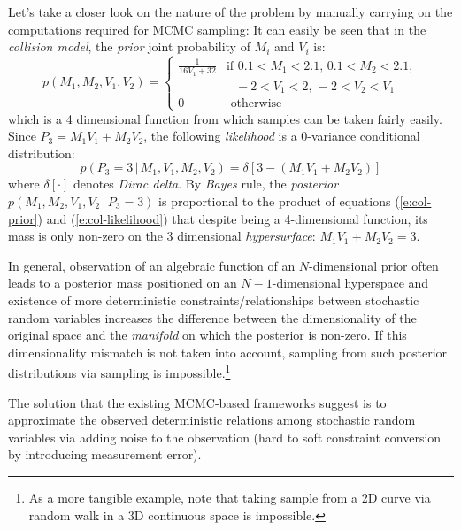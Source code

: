 \documentclass{article}
\newcommand{\otherwise}[1]{#1 &\text{ otherwise}}
\newcommand{\pr}{p}
\begin{document}
Let's take a closer look on the nature of the problem by manually carrying on the computations required for MCMC sampling:
It can easily be seen that in the \emph{collision model}, 
the \emph{prior} joint probability of 
{\footnotesize $M_i$} and 
{\footnotesize $V_i$} is:
{\footnotesize
\begin{equation}  
\label{e:col-prior}
\pr(M_1, M_2, V_1, V_2)  
=
\begin{cases}
\frac{1}{16 V_1 + 32} &{\text{if }\scriptstyle 0.1<M_1<2.1, \, 0.1<M_2<2.1,}\\
							 &{\;\;\, \scriptstyle -2<V_1<2, \, -2<V_2 < V_1}\\
 \otherwise{0}
 \end{cases}
\end{equation}
}
which is a 4 dimensional function from which samples can be taken fairly easily. 
Since {\footnotesize $P_3 = M_1 V_1 + M_2 V_2$}, 
the following \emph{likelihood} is a 0-variance conditional distribution:
\begin{equation}
\label{e:col-likelihood}
\pr(P_3 = 3 \,|\, M_1, V_1, M_2, V_2) = \delta[3 - (M_1 V_1 + M_2 V_2)]
\end{equation}
where $\delta[\cdot]$ denotes \emph{Dirac delta}. 
By \emph{Bayes} rule, 
the \emph{posterior} 
{\footnotesize $\pr(M_1, M_2, V_1, V_2 \,|\, P_3 = 3)$}
is proportional to the product of equations (\ref{e:col-prior}) and (\ref{e:col-likelihood}) 
that despite being a 4-dimensional function, its mass is only non-zero on the 3 dimensional \emph{hypersurface}: {\footnotesize$M_1 V_1 + M_2 V_2 = 3$}. 


In general, observation of an algebraic function of an $N$-dimensional prior often leads to a posterior mass positioned on an $N-1$-dimensional hyperspace and existence of more deterministic constraints/relationships between stochastic random variables increases the difference between the dimensionality of the original space and the \emph{manifold} on which the posterior is non-zero.  
If this dimensionality mismatch is not taken into account, sampling from such posterior distributions via sampling is impossible.\footnote{As a more tangible example, note that taking sample from a 2D curve via random walk in a 3D continuous space is impossible.}  

The solution that the existing MCMC-based frameworks suggest is to approximate the observed deterministic relations among  stochastic random variables via adding noise to the observation 
(hard to soft constraint conversion by introducing measurement error).
\end{document}
